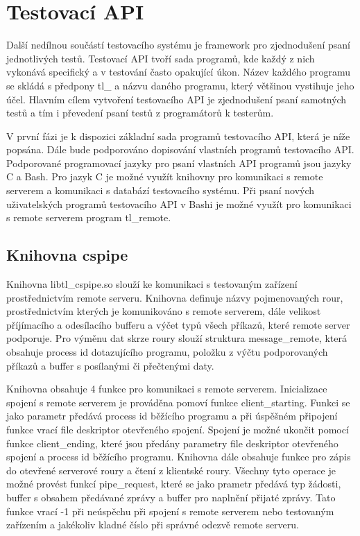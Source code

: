 \chapter{Testovací API}
Další nedílnou součástí testovacího systému je framework pro zjednodušení psaní jednotlivých testů. Testovací API tvoří sada programů, kde každý z nich vykonává specifický a v testování často opakující úkon. Název každého programu se skládá s předpony tl\_ a názvu daného programu, který většinou vystihuje jeho účel. Hlavním cílem vytvoření testovacího API je zjednodušení psaní samotných testů a tím i převedení psaní testů z programátorů k testerům.

V první fázi je k dispozici základní sada programů testovacího API, která je níže popsána. Dále bude podporováno dopisování vlastních programů testovacího API. Podporované programovací jazyky pro psaní vlastních API programů jsou jazyky C a Bash. Pro jazyk C je možné využít knihovny pro komunikaci s remote serverem a komunikaci s databází testovacího systému. Při psaní nových uživatelských programů testovacího API v Bashi je možné využít pro komunikaci s remote serverem program tl\_remote.

\section{Knihovna cspipe}
Knihovna libtl\_cspipe.so slouží ke komunikaci s testovaným zařízení prostřednictvím remote serveru. Knihovna definuje názvy pojmenovaných rour, prostřednictvím kterých je komunikováno s remote serverem, dále velikost příjímacího a odesílacího bufferu a výčet typů všech příkazů, které remote server podporuje. Pro výměnu dat skrze roury slouží struktura message\_remote, která obsahuje process id dotazujícího programu, položku z výčtu podporovaných příkazů a buffer s posílanými či přečtenými daty.

Knihovna obsahuje 4 funkce pro komunikaci s remote serverem. Inicializace spojení s remote serverem je prováděna pomoví funkce client\_starting. Funkci se jako parametr předává process id běžícího programu a při úspěšném připojení funkce vrací file deskriptor otevřeného spojení. Spojení je možné ukončit pomocí funkce client\_ending, které jsou předány parametry file deskriptor otevřeného spojení a process id běžícího programu. Knihovna dále obsahuje funkce pro zápis do otevřené serverové roury a čtení z klientské roury. Všechny tyto operace je možné provést funkcí pipe\_request, které se jako prametr předává typ žádosti, buffer s obsahem předávané zprávy a buffer pro naplnění přijaté zprávy. Tato funkce vrací -1 při neúspěchu při spojení s remote serverem nebo testovaným zařízením a jakékoliv kladné číslo při správné odezvě remote serveru.


